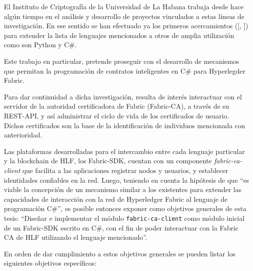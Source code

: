 El Instituto de Criptograf\'ia de la Universidad de La Habana trabaja desde hace alg\'un tiempo en el an\'alisis y desarrollo de proyectos vinculados a estas l\'ineas de investigaci\'on. En ese sentido se han efectuado ya los primeros acercamientos ([\cite{chaincode22python}, \cite{chaincode22csharp}]) para extender la lista de lenguajes mencionados a otros de amplia utilizaci\'on como son Python y C\#.

Este trabajo en particular, pretende proseguir con el desarrollo de mecanismos que permitan la programaci\'on de contratos inteligentes en C\# para Hyperlegder Fabric.

Para dar continuidad a dicha investigaci\'on, resulta de inter\'es interactuar con el servidor de la autoridad certificadora de Fabric (Fabric-CA), a trav\'es de su REST-API, y as\'i administrar el ciclo de vida de los certificados de usuario. Dichos certificados son la base de la identificaci\'on de individuos mencionada con anterioridad. 

Las plataformas desarrolladas para el intercambio entre cada lenguaje particular y la blockchain de HLF, los Fabric-SDK, cuentan con un componente \emph{fabric-ca-client} que facilita a las aplicaciones registrar nodos y usuarios, y establecer identidades confiables en la red. Luego, teniendo en cuenta la hipótesis de que “es viable la concepci\'on de un mecanismo similar a los existentes para extender las capacidades de interacci\'on con la red de Hyperledger Fabric al lenguaje de programaci\'on C\#”, es posible entonces exponer como objetivos
generales de esta tesis: “Diseñar e implementar el m\'odulo \texttt{fabric-ca-client} como m\'odulo inicial de un Fabric-SDK escrito en C\#, con el fin de poder interactuar con la Fabric CA de HLF utilizando el lenguaje mencionado”.


En orden de dar cumplimiento a estos objetivos generales se pueden listar los siguientes objetivos específicos:

 

